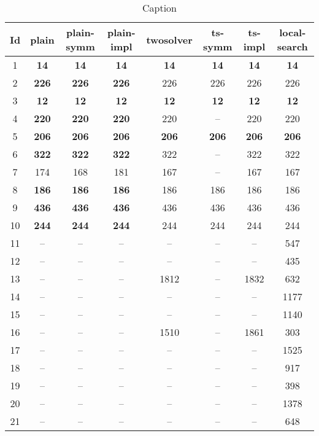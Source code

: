 \begin{table}[h]
	\centering
	\caption{Caption}
	\begin{tabular}{cccccccc}
		\toprule
		Id & plain & plain-symm & plain-impl & twosolver & ts-symm & ts-impl & local-search \\ 
		\midrule
		1 & \textbf{14} & 	\textbf{14} & 	\textbf{14} & 	\textbf{14} & 	\textbf{14} & 	\textbf{14} & 	\textbf{14} \\ 
		2 & \textbf{226} & 	\textbf{226} & 	\textbf{226} & 	226 & 	226 & 	226 & 	226 \\ 
		3 & \textbf{12} & 	\textbf{12} & 	\textbf{12} & 	\textbf{12} & 	\textbf{12} & 	\textbf{12} & 	\textbf{12} \\ 
		4 & \textbf{220} & 	\textbf{220} & 	\textbf{220} & 	220 & 	-- & 	220 & 	220 \\ 
		5 & \textbf{206} & 	\textbf{206} & 	\textbf{206} & 	\textbf{206} & 	\textbf{206} & 	\textbf{206} & 	\textbf{206} \\ 
		6 & \textbf{322} & 	\textbf{322} & 	\textbf{322} & 	322 & 	-- & 	322 & 	322 \\ 
		7 & 174 & 	168 & 	181 & 	167 & 	-- & 	167 & 	167 \\ 
		8 & \textbf{186} & 	\textbf{186} & 	\textbf{186} & 	186 & 	186 & 	186 & 	186 \\ 
		9 & \textbf{436} & 	\textbf{436} & 	\textbf{436} & 	436 & 	436 & 	436 & 	436 \\ 
		10 & \textbf{244} & 	\textbf{244} & 	\textbf{244} & 	244 & 	244 & 	244 & 	244 \\ 
		11 & -- & 	-- & 	-- & 	-- & 	-- & 	-- & 	547 \\ 
		12 & -- & 	-- & 	-- & 	-- & 	-- & 	-- & 	435 \\ 
		13 & -- & 	-- & 	-- & 	1812 & 	-- & 	1832 & 	632 \\ 
		14 & -- & 	-- & 	-- & 	-- & 	-- & 	-- & 	1177 \\ 
		15 & -- & 	-- & 	-- & 	-- & 	-- & 	-- & 	1140 \\ 
		16 & -- & 	-- & 	-- & 	1510 & 	-- & 	1861 & 	303 \\ 
		17 & -- & 	-- & 	-- & 	-- & 	-- & 	-- & 	1525 \\ 
		18 & -- & 	-- & 	-- & 	-- & 	-- & 	-- & 	917 \\ 
		19 & -- & 	-- & 	-- & 	-- & 	-- & 	-- & 	398 \\ 
		20 & -- & 	-- & 	-- & 	-- & 	-- & 	-- & 	1378 \\ 
		21 & -- & 	-- & 	-- & 	-- & 	-- & 	-- & 	648 \\ 
		\bottomrule
	\end{tabular}
\end{table}






    

